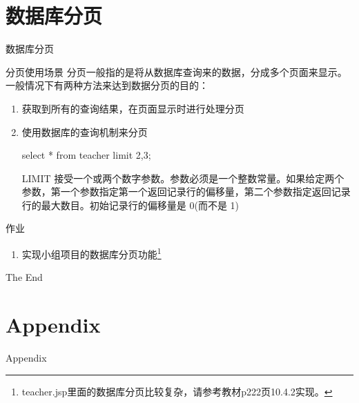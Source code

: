 \documentclass{beamer}
\begin{document}
\section{数据库分页}
\begin{frame}
\Huge{\centerline{数据库分页}}
\end{frame}
\begin{frame}{分页使用场景}
分页一般指的是将从数据库查询来的数据，分成多个页面来显示。
一般情况下有两种方法来达到数据分页的目的：
\begin{enumerate}
\item
获取到所有的查询结果，在页面显示时进行处理分页

\item
使用数据库的查询机制来分页

select * from teacher limit 2,3;

LIMIT 接受一个或两个数字参数。参数必须是一个整数常量。如果给定两个参数，第一个参数指定第一个返回记录行的偏移量，第二个参数指定返回记录行的最大数目。初始记录行的偏移量是 0(而不是 1)
\end{enumerate}
\end{frame}
\begin{frame}{作业}
\begin{enumerate}
\item
实现小组项目的数据库分页功能\footnote{teacher.jsp里面的数据库分页比较复杂，请参考教材p222页10.4.2实现。}


\end{enumerate}
\end{frame}

\begin{frame}
\Huge{\centerline{The End}}
\end{frame}

\section{Appendix}

\begin{frame}
\Huge{\centerline{Appendix}}
\end{frame}
\end{document}
